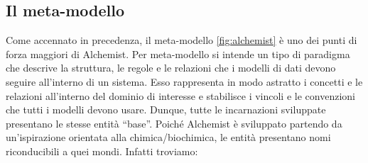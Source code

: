 \subsection{Il meta-modello} 
Come accennato in precedenza, il meta-modello \cref{fig:alchemist} è uno dei punti di forza maggiori di Alchemist. 
Per meta-modello si intende un tipo di paradigma che descrive la struttura, le regole e le relazioni
che i modelli di dati devono seguire all'interno di un sistema. Esso rappresenta in modo astratto i 
concetti e le relazioni all'interno del dominio di interesse e stabilisce i vincoli e le convenzioni
che tutti i modelli devono usare. Dunque, tutte le incarnazioni sviluppate presentano le stesse entità
``base''. Poiché Alchemist è sviluppato partendo da un'ispirazione orientata alla chimica/biochimica,
le entità presentano nomi riconducibili a quei mondi. Infatti troviamo:
